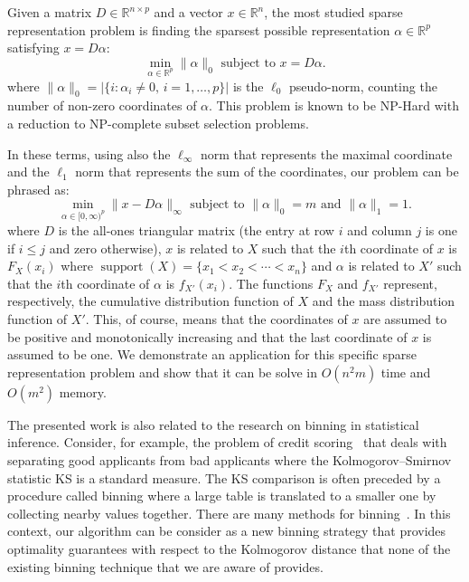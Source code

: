\documentclass{article}
\DeclareMathOperator{\support}{support}
\begin{document}
Given a matrix $D \in \mathbb{R}^{n \times p}$ and a vector $x \in \mathbb{R}^n$, the most studied sparse representation problem is finding the sparsest possible representation $\alpha \in \mathbb{R}^p$ satisfying $x = D\alpha$:
$$
\min_{\alpha \in \mathbb{R}^p} \|\alpha\|_0 \text{ subject to } x = D\alpha.
$$
where $\|\alpha\|_0 = |\{ i : \alpha_i \neq 0, \, i=1,\ldots,p \}|$ is the $\ell_0$ pseudo-norm, counting the number of non-zero coordinates of $\alpha$. This problem is known to be NP-Hard with a reduction to NP-complete subset selection problems.

In these terms, using also the $\ell_\infty$ norm that represents the maximal coordinate and the $\ell_1$ norm that represents the sum of the coordinates, our problem can be phrased as:
$$
\min_{\alpha \in [0,\infty)^p}\|x - D\alpha\|_{\infty} \text{ subject to }  \|\alpha\|_0 = m \text{ and } \|\alpha\|_1=1.
$$
where $D$ is the all-ones triangular matrix (the entry at row $i$ and column $j$ is one if $i\leq j$ and zero otherwise), $x$ is related to $X$ such that the $i$th coordinate of $x$ is $F_X(x_i)$ where $\support(X)=\{x_1 < x_2 < \cdots < x_n\}$ and $\alpha$ is related to $X'$ such that the $i$th coordinate of $\alpha$ is $f_{X'}(x_i)$. The functions $F_X$ and $f_{X'}$ represent, respectively, the cumulative distribution function of $X$ and the mass distribution function of $X'$. This, of course, means that the coordinates of $x$ are assumed to be positive and monotonically increasing and that the last coordinate of $x$ is assumed to be one. We demonstrate an application for this specific sparse representation problem and show that it can be solve in $O(n^2m)$ time and $O(m^2)$ memory.

The presented work is also related to the research on binning in statistical inference. Consider, for example, the problem of credit scoring~\cite{zeng2017comparison} that deals with separating good applicants from bad applicants where the Kolmogorov–Smirnov statistic KS is a standard measure. The KS comparison is often preceded by a procedure called binning where a large table is translated to a smaller one by collecting nearby values together. There are many methods for binning~\cite{mays2001handbook,refaat2011credit,bolton2010logistic,siddiqi2012credit}.
In this context, our algorithm can be consider as a new binning strategy that provides optimality guarantees with respect to the Kolmogorov distance that none of the existing binning technique that we are aware of provides.
\end{document}
